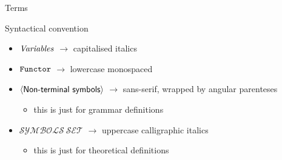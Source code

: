 \documentclass[presentation]{beamer}\mode<presentation>{\usetheme{AMSBolognaFC}}
\begin{document}
\begin{frame}[allowframebreaks]{Terms}
    \begin{block}{Syntactical convention}
        \label{slide:convention}
        \begin{itemize}
            \item $\mathit{Variables}$ $\rightarrow$ capitalised italics
            \item $\mathtt{Functor}$ $\rightarrow$ lowercase monospaced
            \item $\meta{Non\text{-}terminal\ symbols}$ $\rightarrow$ sans-serif, wrapped by angular parenteses
            \begin{itemize}
                \item this is just for grammar definitions
            \end{itemize}
            \item $\mathcal{SYMBOLS\ SET}$ $\rightarrow$ uppercase calligraphic italics
            \begin{itemize}
                \item this is just for theoretical definitions
            \end{itemize}
        \end{itemize}
    \end{block}
\end{frame}
\end{document}
